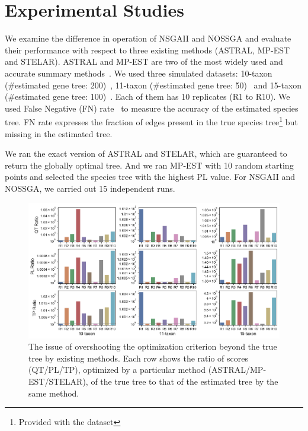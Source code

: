 \section{Experimental Studies}
\label{sec:experiment}
We examine the difference in operation of NSGAII and NOSSGA and evaluate their performance with respect to three existing methods (ASTRAL, MP-EST and STELAR). ASTRAL and MP-EST are two of the most widely used and accurate summary methods~\cite{islam2019stelar}. We used three simulated datasets: 10-taxon (\#estimated gene tree: 200)~\cite{bayzid2015weighted}, 11-taxon (\#estimated gene tree: 50)~\cite{chung2011comparing} and 15-taxon (\#estimated gene tree: 100)~\cite{statistical-binning}. Each of them has 10 replicates (R1 to R10). We used False Negative (FN) rate~\cite{bayzid2013naive} to measure the accuracy of the estimated species tree. FN rate expresses the fraction of edges present in the true species tree\footnote{Provided with the dataset} but missing in the estimated tree. %

We ran the exact version of ASTRAL and STELAR, which are guaranteed to return the globally optimal tree. And we ran MP-EST with 10 random starting points and selected the species tree with the highest PL value. For NSGAII and NOSSGA, we carried out 15 independent runs.  

\begin{figure}
	\begin{adjustwidth}{-4cm}{-3cm}
		\centering	
		\includegraphics[width=1.6\textwidth]{Figure/tool_ratio}
	\end{adjustwidth}
		\caption{The issue of overshooting the optimization criterion beyond the true tree by existing methods. Each row shows the ratio of scores (QT/PL/TP), optimized by a particular method (ASTRAL/MP-EST/STELAR), of the true tree to that of the estimated tree by the same method.} \label{fig:tool_ratio}
	
\end{figure}

